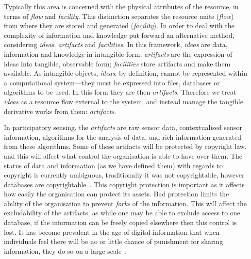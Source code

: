 Typically this area is concerned with the physical attributes of the resource, in terms of \emph{flow} and \emph{facility}. This distinction separates the resource units (\emph{flow}) from where they are stored and generated (\emph{facility}). In order to deal with the complexity of information and knowledge  put forward an alternative method, considering \emph{ideas}, \emph{artifacts} and \emph{facilities}. 
In this framework, \emph{ideas} are data, information and knowledge in intangible form; \emph{artifacts} are the expression of ideas into tangible, observable form; \emph{facilities} store artifacts and make them available. 
As intangible objects, \emph{ideas}, by definition, cannot be represented within a computational system---they must be expressed into files, databases or algorithms to be used. In this form they are then \emph{artifacts}. Therefore we treat \emph{ideas} as a resource flow external to the system, and instead manage the tangible derivative works from them: \emph{artifacts}.

In participatory sensing, the \emph{artifacts} are raw sensor data, contextualised sensor information, algorithms for the analysis of data, and rich information generated from these algorithms. Some of these artifacts will be protected by copyright law, and this will affect what control the organisation is able to have over them. The status of data and information (as we have defined them) with regards to copyright is currently ambiguous, traditionally it was not copyrightable, however databases are copyrightable~\citep{Miller2008}. This copyright protection is important as it affects how easily the organisation can protect its assets. Bad protection limits the ability of the organisation to prevent \emph{forks} of the information. This will affect the excludability of the artifacts, as while one may be able to exclude access to one database, if the information can be freely copied elsewhere then this control is lost. It has become prevalent in the age of digital information that when individuals feel there will be no or little chance of punishment for sharing information, they do so on a large scale~\citep[pp.\ 62--66]{Lessig2004}.

